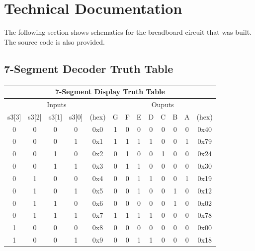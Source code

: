 \documentclass[11pt]{article}
\begin{document}
\clearpage

\section{Technical Documentation}

The following section shows schematics for the breadboard circuit that was built. The source code is also provided.

\subsection{7-Segment Decoder Truth Table}

\begin{table}[h]
\centering
\begin{tabular}{|c|c|c|c|c|c|c|c|c|c|c|c|c|}
\hline
\multicolumn{13}{|c|}{\textbf{7-Segment Display Truth Table}}                                  \\ \hline
\multicolumn{5}{|c|}{Inputs}                      & \multicolumn{8}{c|}{Ouputs}       \\ \hline
s3{[}3{]} & s3{[}2{]} & s3{[}1{]} & s3{[}0{]} & (hex) & G & F & E & D & C & B & A & (hex) \\ \hline
0        & 0        & 0        & 0        & 0x0   & 1 & 0 & 0 & 0 & 0 & 0 & 0 & 0x40  \\ \hline
0        & 0        & 0        & 1        & 0x1   & 1 & 1 & 1 & 1 & 0 & 0 & 1 & 0x79  \\ \hline
0        & 0        & 1        & 0        & 0x2   & 0 & 1 & 0 & 0 & 1 & 0 & 0 & 0x24  \\ \hline
0        & 0        & 1        & 1        & 0x3   & 0 & 1 & 1 & 0 & 0 & 0 & 0 & 0x30  \\ \hline
0        & 1        & 0        & 0        & 0x4   & 0 & 0 & 1 & 1 & 0 & 0 & 1 & 0x19  \\ \hline
0        & 1        & 0        & 1        & 0x5   & 0 & 0 & 1 & 0 & 0 & 1 & 0 & 0x12  \\ \hline
0        & 1        & 1        & 0        & 0x6   & 0 & 0 & 0 & 0 & 0 & 1 & 0 & 0x02  \\ \hline
0        & 1        & 1        & 1        & 0x7   & 1 & 1 & 1 & 1 & 0 & 0 & 0 & 0x78  \\ \hline
1        & 0        & 0        & 0        & 0x8   & 0 & 0 & 0 & 0 & 0 & 0 & 0 & 0x00  \\ \hline
1        & 0        & 0        & 1        & 0x9   & 0 & 0 & 1 & 1 & 0 & 0 & 0 & 0x18  \\ \hline

\end{tabular}
\end{table}
\end{document}
